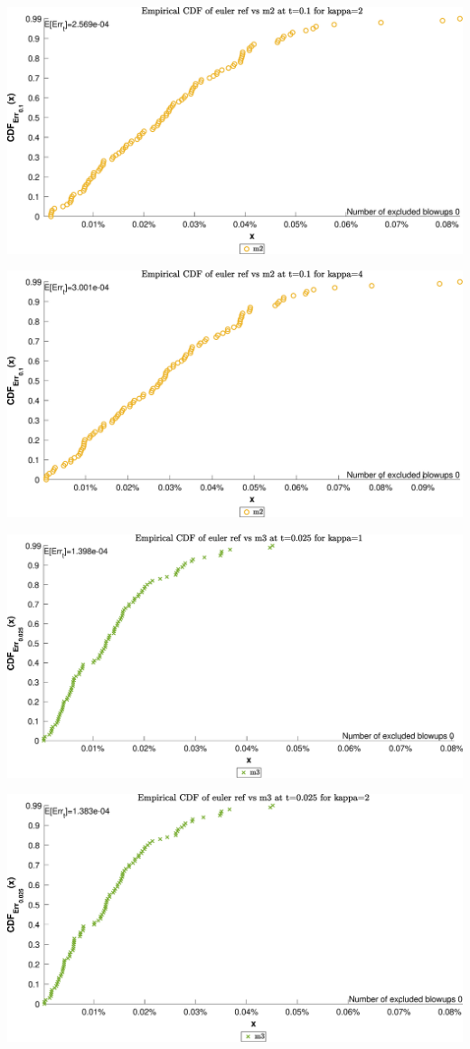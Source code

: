 \begin{landscape}
\includegraphics[width=.95\columnwidth]{CDF/CDFEulerRef_26}
\end{landscape}
\begin{landscape}
\includegraphics[width=.95\columnwidth]{CDF/CDFEulerRef_27}
\end{landscape}
\begin{landscape}
\includegraphics[width=.95\columnwidth]{CDF/CDFEulerRef_28}
\end{landscape}
\begin{landscape}
\includegraphics[width=.95\columnwidth]{CDF/CDFEulerRef_29}
\end{landscape}
